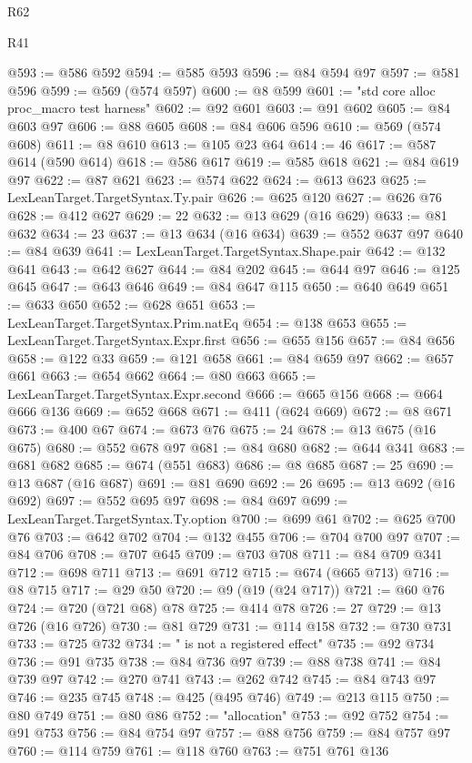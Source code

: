 \begin{lexlean}{R62}
\begin{lexlean}{R41}
\begin{coremodule}
{{{{{{{{{{{{{{{{{{{{{{{{{{{{{{{{{{{{{{{{{{{{{{{{{{{{{{{{{{{{{{{{{{{{{{{{{{{{{{{{{{{{{{{@593 := @586 @592
@594 := @585 @593
@596 := @84 @594 @97
@597 := @581 @596
@599 := @569 (@574 @597)
@600 := @8 @599
@601 := "std core alloc proc_macro test harness"
@602 := @92 @601
@603 := @91 @602
@605 := @84 @603 @97
@606 := @88 @605
@608 := @84 @606 @596
@610 := @569 (@574 @608)
@611 := @8 @610
@613 := @105 @23 @64
@614 := 46
@617 := @587 @614 (@590 @614)
@618 := @586 @617
@619 := @585 @618
@621 := @84 @619 @97
@622 := @87 @621
@623 := @574 @622
@624 := @613 @623
@625 := LexLeanTarget.TargetSyntax.Ty.pair
@626 := @625 @120
@627 := @626 @76
@628 := @412 @627
@629 := 22
@632 := @13 @629 (@16 @629)
@633 := @81 @632
@634 := 23
@637 := @13 @634 (@16 @634)
@639 := @552 @637 @97
@640 := @84 @639
@641 := LexLeanTarget.TargetSyntax.Shape.pair
@642 := @132 @641
@643 := @642 @627
@644 := @84 @202
@645 := @644 @97
@646 := @125 @645
@647 := @643 @646
@649 := @84 @647 @115
@650 := @640 @649
@651 := @633 @650
@652 := @628 @651
@653 := LexLeanTarget.TargetSyntax.Prim.natEq
@654 := @138 @653
@655 := LexLeanTarget.TargetSyntax.Expr.first
@656 := @655 @156
@657 := @84 @656
@658 := @122 @33
@659 := @121 @658
@661 := @84 @659 @97
@662 := @657 @661
@663 := @654 @662
@664 := @80 @663
@665 := LexLeanTarget.TargetSyntax.Expr.second
@666 := @665 @156
@668 := @664 @666 @136
@669 := @652 @668
@671 := @411 (@624 @669)
@672 := @8 @671
@673 := @400 @67
@674 := @673 @76
@675 := 24
@678 := @13 @675 (@16 @675)
@680 := @552 @678 @97
@681 := @84 @680
@682 := @644 @341
@683 := @681 @682
@685 := @674 (@551 @683)
@686 := @8 @685
@687 := 25
@690 := @13 @687 (@16 @687)
@691 := @81 @690
@692 := 26
@695 := @13 @692 (@16 @692)
@697 := @552 @695 @97
@698 := @84 @697
@699 := LexLeanTarget.TargetSyntax.Ty.option
@700 := @699 @61
@702 := @625 @700 @76
@703 := @642 @702
@704 := @132 @455
@706 := @704 @700 @97
@707 := @84 @706
@708 := @707 @645
@709 := @703 @708
@711 := @84 @709 @341
@712 := @698 @711
@713 := @691 @712
@715 := @674 (@665 @713)
@716 := @8 @715
@717 := @29 @50
@720 := @9 (@19 (@24 @717))
@721 := @60 @76
@724 := @720 (@721 @68) @78
@725 := @414 @78
@726 := 27
@729 := @13 @726 (@16 @726)
@730 := @81 @729
@731 := @114 @158
@732 := @730 @731
@733 := @725 @732
@734 := " is not a registered effect"
@735 := @92 @734
@736 := @91 @735
@738 := @84 @736 @97
@739 := @88 @738
@741 := @84 @739 @97
@742 := @270 @741
@743 := @262 @742
@745 := @84 @743 @97
@746 := @235 @745
@748 := @425 (@495 @746)
@749 := @213 @115
@750 := @80 @749
@751 := @80 @86
@752 := "allocation"
@753 := @92 @752
@754 := @91 @753
@756 := @84 @754 @97
@757 := @88 @756
@759 := @84 @757 @97
@760 := @114 @759
@761 := @118 @760
@763 := @751 @761 @136
}}}}}}}}}}}}}}}}}}}}}}}}}}}}}}}}}}}}}}}}}}}}}}}}}}}}}}}}}}}}}}}}}}}}}}}}}}}}}}}}}}}}}}}
\end{coremodule}
\end{lexlean}
\end{lexlean}

